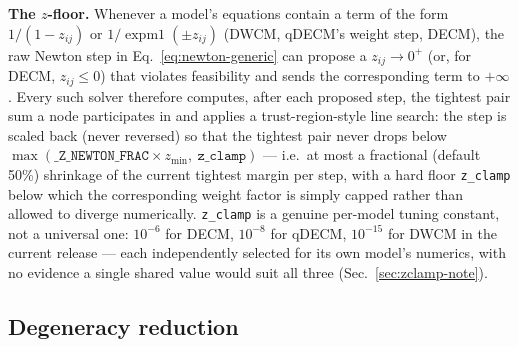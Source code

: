 \documentclass[10pt]{article}
\newcommand{\expm}{\operatorname{expm1}}
\begin{document}
\textbf{The $z$-floor.} Whenever a model's equations contain a term of the
form $1/(1-z_{ij})$ or $1/\expm(\pm z_{ij})$ (DWCM, qDECM's weight step,
DECM), the raw Newton step in Eq.~\ref{eq:newton-generic} can propose a
$z_{ij}\to0^+$ (or, for DECM, $z_{ij}\le0$) that violates feasibility and
sends the corresponding term to $+\infty$. Every such solver therefore
computes, after each proposed step, the tightest pair sum a node
participates in and applies a trust-region-style line search: the step is
scaled back (never reversed) so that the tightest pair never drops below
$\max(\texttt{\_Z\_NEWTON\_FRAC}\times z_{\min},\ \texttt{z\_clamp})$ ---
i.e.\ at most a fractional (default 50\%) shrinkage of the current
tightest margin per step, with a hard floor \texttt{z\_clamp} below which
the corresponding weight factor is simply capped rather than allowed to
diverge numerically. \texttt{z\_clamp} is a genuine per-model tuning
constant, not a universal one: $10^{-6}$ for DECM, $10^{-8}$ for qDECM,
$10^{-15}$ for DWCM in the current release --- each independently selected
for its own model's numerics, with no evidence a single shared value would
suit all three (Sec.~\ref{sec:zclamp-note}).

\subsection{Degeneracy reduction}
\label{sec:degeneracy}
\end{document}
